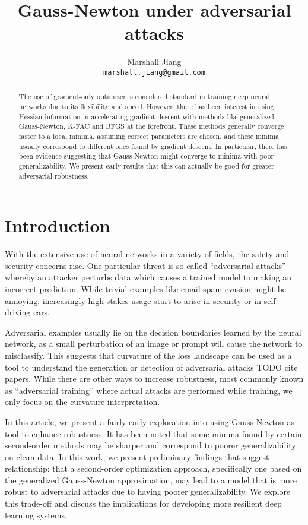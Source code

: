 \documentclass{article}
\title{Gauss-Newton under adversarial attacks}
\author{%
  Marshall Jiang \\
  \texttt{marshall.jiang@gmail.com} \\
}
\begin{document}
\maketitle


\begin{abstract}
    The use of gradient-only optimizer is considered standard in training deep neural networks due to its flexibility and speed.
    However, there has been interest in using Hessian information in accelerating gradient descent with methods like
    generalized Gauss-Newton, K-FAC and BFGS at the forefront.
    These methods generally converge faster to a local minima, assuming correct parameters are chosen, and these minima usually correspond to different ones found by gradient descent.
    In particular, there has been evidence suggesting that Gauss-Newton might converge to minima with poor generalizability.
    We present early results that this can actually be good for greater adversarial robustness.
\end{abstract}


\section{Introduction}
With the extensive use of neural networks in a variety of fields, the safety and security concerns rise.
One particular threat is so called ``adversarial attacks'' whereby an attacker perturbs data which causes a trained model to making an incorrect prediction.
While trivial examples like email spam evasion might be annoying, increasingly high stakes usage start to arise in security or in self-driving cars.

Adversarial examples usually lie on the decision boundaries learned by the neural network, as a small perturbation of an image or prompt will cause the network to misclassify.
This suggests that curvature of the loss landscape can be used as a tool to understand the generation or detection of adversarial attacks TODO cite papers.
While there are other ways to increase robustness, most commonly known as ``adversarial training'' where actual attacks are performed while training, we only focus on the curvature interpretation.

In this article, we present a fairly early exploration into using Gauss-Newton as tool to enhance robustness.
It has been noted that some minima found by certain second-order methods may be sharper and correspond to poorer generalizability on clean data.
In this work, we present preliminary findings that suggest relationship: that a second-order optimization approach, specifically one based on the generalized Gauss-Newton approximation, may lead to a model that is more robust to adversarial attacks due to having poorer generalizability.
We explore this trade-off and discuss the implications for developing more resilient deep learning systems.
\end{document}
